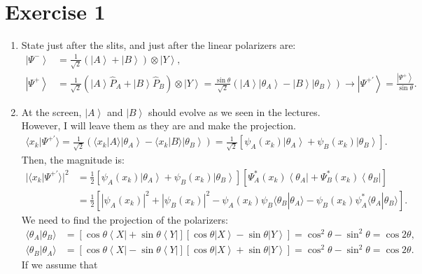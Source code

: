 \documentclass[letterpaper,11pt,twoside]{article}
\title{\textbf{\assignment}\\\course\\{\Large\institution}}
\author{\autor}
\newcommand{\hP}{\hat{P}}
\newcommand{\ket}[1]{\left|#1\right\rangle}
\newcommand{\bra}[1]{\left\langle#1\right|}
\newcommand{\braket}[1]{\langle#1\rangle}
\begin{document}
\pagestyle{mainstyle}
\maketitle
\section*{Exercise 1}
\begin{enumerate}[itemsep=0pt,topsep=0pt,parsep=0pt,label=\alph*)]
  \item State just after the slits, and just after the linear polarizers are:
  \begin{align*}
    \ket{\Psi^-}&=\frac{1}{\sqrt{2}}(\ket{A}+\ket{B})\otimes\ket{Y},\\
    \ket{\Psi^+}&=\frac{1}{\sqrt{2}}(\ket{A}\hP_A+\ket{B}\hP_B)\otimes\ket{Y}=\frac{\sin\theta}{\sqrt{2}}(\ket{A}
    \ket{\theta_A}-\ket{B}\ket{\theta_B})\longrightarrow\ket{\Psi^{+'}}=\frac{\ket{\Psi^+}}{\sin\theta}.
  \end{align*}
  \item At the screen, $\ket{A}$ and $\ket{B}$ should evolve as we seen in the lectures. However, I will leave them as they are and make the projection.
  \begin{align*}
    \braket{x_k|\Psi^{+'}}=\frac{1}{\sqrt{2}}(\braket{x_k|A}\ket{\theta_A}-\braket{x_k|B}\ket{\theta_B})=\frac{1}{\sqrt{2}}[\psi_A(x_k)\ket{\theta_A}+
    \psi_B(x_k)\ket{\theta_B}].
  \end{align*}
  Then, the magnitude is:
  \begin{align*}
    |\braket{x_k|\Psi^{+'}}|^2&=\frac{1}{2}[\psi_A(x_k)\ket{\theta_A}+
    \psi_B(x_k)\ket{\theta_B}][\Psi^*_A(x_k)\bra{\theta_A}+
    \Psi^*_B(x_k)\bra{\theta_B}]\\
    &=\frac{1}{2}\left[|\psi_A(x_k)|^2+|\psi_B(x_k)|^2-\psi_A(x_k)\psi_B\braket{\theta_B|\theta_A}-\psi_B(x_k)\psi_A^*\braket{\theta_A|\theta_B}\right].
  \end{align*}
  We need to find the projection of the polarizers:
  \begin{align*}
    \braket{\theta_A|\theta_B}&=[\cos\theta\bra{X}+\sin\theta\bra{Y}][\cos\theta\ket{X}-\sin\theta\ket{Y}]=\cos^2\theta-\sin^2\theta=\cos2\theta,\\
    \braket{\theta_B|\theta_A}&=[\cos\theta\bra{X}-\sin\theta\bra{Y}][\cos\theta\ket{X}+\sin\theta\ket{Y}]=\cos^2\theta-\sin^2\theta=\cos2\theta.
  \end{align*}
  If we assume that 
  \begin{align*}

\end{align*}
\end{enumerate}
\end{document}
